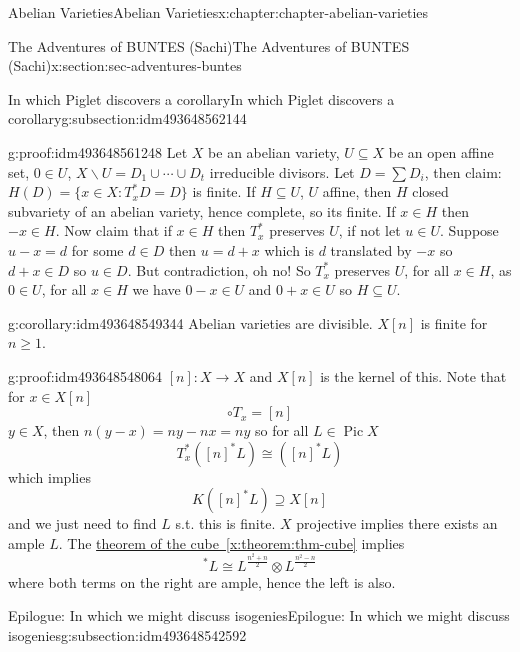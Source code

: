 \documentclass[oneside,10pt,]{book}
\numberwithin{equation}{section}
\DeclareMathOperator{\Pic}{Pic}
\begin{document}
\begin{chapterptx}{Abelian Varieties}{}{Abelian Varieties}{}{}{x:chapter:chapter-abelian-varieties}
\begin{sectionptx}{The Adventures of BUNTES (Sachi)}{}{The Adventures of BUNTES (Sachi)}{}{}{x:section:sec-adventures-buntes}
\begin{subsectionptx}{In which Piglet discovers a corollary}{}{In which Piglet discovers a corollary}{}{}{g:subsection:idm493648562144}
\begin{proofptx}{}{g:proof:idm493648561248}
Let \(X\) be an abelian variety, \(U \subseteq X\) be an open affine set, \(0\in U\), \(X\smallsetminus U = D_1 \cup \cdots \cup D_t\) irreducible divisors. Let \(D = \sum D_i\), then claim: \(H(D) = \{x\in X: T_x^*D  = D \}\) is finite. If \(H\subseteq U\), \(U\) affine, then \(H\) closed subvariety of an abelian variety, hence complete, so its finite. If \(x\in H\) then \(-x \in H\). Now claim that if \(x\in H\) then \(T_x^*\) preserves \(U\), if not let \(u\in U\). Suppose \(u-x = d\) for some \(d\in D\) then \(u = d+x\) which is \(d\) translated by \(-x\) so \(d+x \in D\) so \(u\in D\). But contradiction, oh no! So \(T_x^*\) preserves \(U\), for all \(x\in H\), as \(0 \in U\), for all \(x\in H\) we have \(0-x \in U\) and  \(0+x\in U\) so \(H\subseteq U\).%
\end{proofptx}
\begin{corollary}{}{}{g:corollary:idm493648549344}%
Abelian varieties are divisible. \(X[n]\) is finite for \(n\ge 1\).%
\end{corollary}
\begin{proofptx}{}{g:proof:idm493648548064}
\([n]\colon X \to X\) and \(X[n]\) is the kernel of this. Note that for \(x\in X[n]\)%
\begin{equation*}
[n]\circ T_x = [n]
\end{equation*}
\(y\in X\), then \(n(y-x) = ny - nx = ny\) so for all \(L \in \Pic X\)%
\begin{equation*}
T_x^*([n]^* L ) \cong ([n]^* L)
\end{equation*}
which implies%
\begin{equation*}
K([n]^* L ) \supseteq X[n]
\end{equation*}
and we just need to find \(L\) s.t. this is finite. \(X\) projective implies there exists an ample \(L\). The \hyperref[x:theorem:thm-cube]{theorem of the cube~\ref{x:theorem:thm-cube}} implies%
\begin{equation*}
[n]^*L \cong L^{\frac{n^2 + n}{2}} \otimes L^{\frac{n^2 - n}{2}}
\end{equation*}
where both terms on the right are ample, hence the left is also.%
\end{proofptx}
\end{subsectionptx}
%
%
\typeout{************************************************}
\typeout{************************************************}
%
\begin{subsectionptx}{Epilogue: In which we might discuss isogenies}{}{Epilogue: In which we might discuss isogenies}{}{}{g:subsection:idm493648542592}

\end{subsectionptx}
\end{sectionptx}
\end{chapterptx}
\end{document}

